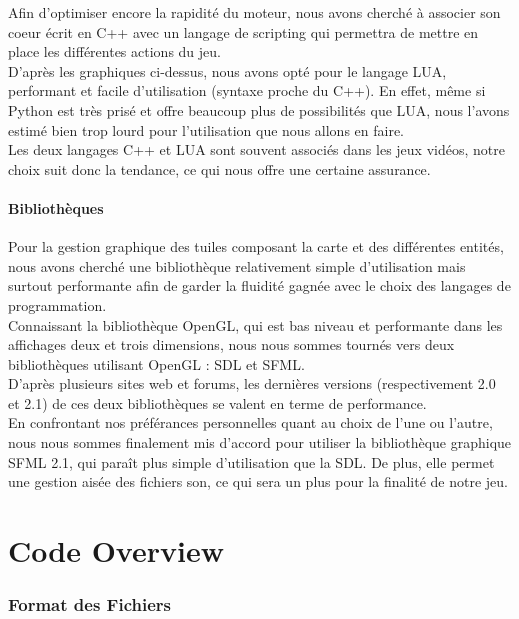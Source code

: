 \documentclass[a4paper]{article}
\newcommand{\alinea}{\hspace*{0.5cm}}
\begin{document}
        \alinea Afin d'optimiser encore la rapidité du moteur, nous avons cherché à associer son coeur écrit en C++ avec un langage de scripting qui permettra de mettre en place les différentes actions du jeu.\\ D'après les graphiques ci-dessus, nous avons opté pour le langage LUA, performant et facile d'utilisation (syntaxe proche du C++). En effet, même si Python est très prisé et offre beaucoup plus de possibilités que LUA, nous l'avons estimé bien trop lourd pour l'utilisation que nous allons en faire.\\
        \alinea Les deux langages C++ et LUA sont souvent associés dans les jeux vidéos, notre choix suit donc la tendance, ce qui nous offre une certaine assurance.

      \subsection{Bibliothèques}
        \alinea Pour la gestion graphique des tuiles composant la carte et des différentes entités, nous avons cherché une bibliothèque relativement simple d'utilisation mais surtout performante afin de garder la fluidité gagnée avec le choix des langages de programmation.\\
        \alinea Connaissant la bibliothèque OpenGL, qui est bas niveau et performante dans les affichages deux et trois dimensions, nous nous sommes tournés vers deux bibliothèques utilisant OpenGL : SDL et SFML.\\
        \alinea D'après plusieurs sites web et forums, les dernières versions (respectivement 2.0 et 2.1) de ces deux bibliothèques se valent en terme de performance.\\
        \alinea En confrontant nos préférances personnelles quant au choix de l'une ou l'autre, nous nous sommes finalement mis d'accord pour utiliser la bibliothèque graphique SFML 2.1, qui paraît plus simple d'utilisation que la SDL. De plus, elle permet une gestion aisée des fichiers son, ce qui sera un plus pour la finalité de notre jeu.
		
		
\newpage
  \part{Code Overview}
    \section{Format des Fichiers}
\end{document}

